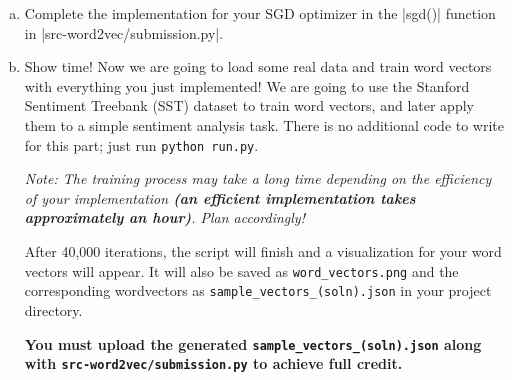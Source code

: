 \begin{enumerate}[(a)]
    \item {} Complete the implementation for your SGD optimizer in the |sgd()| function in |src-word2vec/submission.py|.
    
    \item {} Show time! Now we are going to load some real data and train word vectors with everything you just implemented! We are going to use the Stanford Sentiment Treebank (SST) dataset to train word vectors, and later apply them to a simple sentiment analysis task. There is no additional code to write for this part; just run \texttt{python run.py}.
            
    \emph{Note: The training process may take a long time depending on the efficiency of your implementation \textbf{(an efficient implementation takes approximately an hour)}. Plan accordingly!}

    
        After 40,000 iterations, the script will finish and a visualization for your word vectors will appear. It will also be saved as \texttt{word\_vectors.png} and the corresponding wordvectors as \texttt{sample\_vectors\_(soln).json} in your project directory.

        \textbf{You must upload the generated \texttt{sample\_vectors\_(soln).json} along with \texttt{src-word2vec/submission.py} to achieve full credit.}
\end{enumerate}
